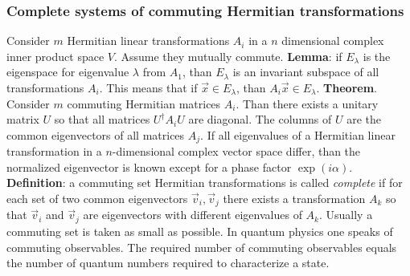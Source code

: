 \subsubsection{Complete systems of commuting Hermitian transformations}
Consider $m$ Hermitian linear transformations $A_i$ in a $n$ dimensional
complex inner product space $V$. Assume they mutually commute.
\npar
{\bf Lemma}: if $E_\lambda$ is the eigenspace for eigenvalue $\lambda$ from
$A_1$, than $E_\lambda$ is an invariant subspace of all transformations
$A_i$. This means that if $\vec{x}\in E_\lambda$, than $A_i\vec{x}\in E_\lambda$.
\npar
{\bf Theorem}. Consider $m$ commuting Hermitian matrices $A_i$. Than there
exists a unitary matrix $U$ so that all matrices $U^\dagger A_iU$ are diagonal.
The columns of $U$ are the common eigenvectors of all matrices $A_j$.
\npar
If all eigenvalues of a Hermitian linear transformation in a $n$-dimensional
complex vector space differ, than the normalized eigenvector is known except
for a phase factor $\exp(i\alpha)$.
\npar
{\bf Definition}: a commuting set Hermitian transformations is called
{\it complete} if for each set of two common eigenvectors $\vec{v}_i,\vec{v}_j$
there exists a transformation $A_k$ so that $\vec{v}_i$ and $\vec{v}_j$ are
eigenvectors with different eigenvalues of $A_k$.
\npar
Usually a commuting set is taken as small as possible. In quantum physics one
speaks of commuting observables. The required number of commuting observables
equals the number of quantum numbers required to characterize a state.

